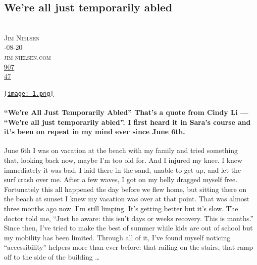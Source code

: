 \documentclass[10pt,a4paper]{article}
\begin{document}
\subsection{We’re all just temporarily abled}
\noindent\begin{minipage}[t]{0.19\linewidth}
\vspace{0pt}
\noindent\scshape\footnotesize
\\ {\scriptsize\faUser}\space 
Jim Nielsen
\\ {\scriptsize\faCalendar}-08-20
\\ {\scriptsize\faGlobe}\space 
jim-nielsen.com
\\ {\scriptsize\faThumbsOUp}\space 
\href{http://news.ycombinator.com/item?id=37205731\&utm\_term=comment}{907} 
\\ {\scriptsize\faComments}\space 
\href{http://news.ycombinator.com/item?id=37205731\&utm\_term=comment}{47} 
\end{minipage} 
\begin{minipage}[t]{0.80\linewidth}
\vspace{0pt}
\begin{multicols}{2}
    \href{https://blog.jim-nielsen.com/2023/temporarily-abled/?utm\_source=hackernewsletter\&utm\_medium=email\&utm\_term=fav}{
        \texttt{[image: 1.png]}
    }
\paragraph{“We’re All Just Temporarily Abled”
That’s a quote from Cindy Li — “We're all just temporarily abled”. I first heard it in Sara’s course and it’s been on repeat in my mind ever since June 6th.}

June 6th I was on vacation at the beach with my family and tried something that, looking back now, maybe I’m too old for. And I injured my knee.
I knew immediately it was bad.
I laid there in the sand, unable to get up, and let the surf crash over me. After a few waves, I got on my belly dragged myself free.
Fortunately this all happened the day before we flew home, but sitting there on the beach at sunset I knew my vacation was over at that point.
That was almost three months ago now. I’m still limping. It’s getting better but it’s slow. The doctor told me, “Just be aware: this isn’t days or weeks recovery. This is months.”
Since then, I’ve tried to make the best of summer while kids are out of school but my mobility has been limited.
Through all of it, I’ve found myself noticing “accessibility” helpers more than ever before: that railing on the stairs, that ramp off to the side of the building
\dots
\end{multicols}
\end{minipage}
\par\medskip
\end{document}
